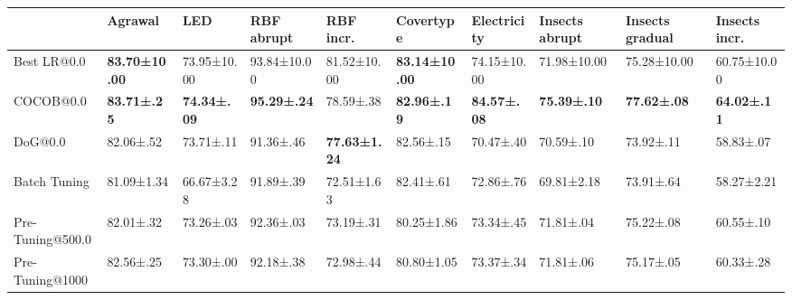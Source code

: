 \begin{tabular}{llllllllll}
    \toprule
                     & Agrawal               & LED                 & RBF abrupt          & RBF incr.            & Covertype             & Electricity         & Insects abrupt      & Insects gradual     & Insects incr.       \\ \midrule
    Best LR@0.0      & \bfseries 83.70±10.00 & 73.95±10.00         & 93.84±10.00         & 81.52±10.00          & \bfseries 83.14±10.00 & 74.15±10.00         & 71.98±10.00         & 75.28±10.00         & 60.75±10.00         \\
    COCOB@0.0        & \bfseries 83.71±.25   & \bfseries 74.34±.09 & \bfseries 95.29±.24 & 78.59±.38            & \bfseries 82.96±.19   & \bfseries 84.57±.08 & \bfseries 75.39±.10 & \bfseries 77.62±.08 & \bfseries 64.02±.11 \\
    DoG@0.0          & 82.06±.52             & 73.71±.11           & 91.36±.46           & \bfseries 77.63±1.24 & 82.56±.15             & 70.47±.40           & 70.59±.10           & 73.92±.11           & 58.83±.07           \\
    Batch Tuning     & 81.09±1.34            & 66.67±3.28          & 91.89±.39           & 72.51±1.63           & 82.41±.61             & 72.86±.76           & 69.81±2.18          & 73.91±.64           & 58.27±2.21          \\
    Pre-Tuning@500.0 & 82.01±.32             & 73.26±.03           & 92.36±.03           & 73.19±.31            & 80.25±1.86            & 73.34±.45           & 71.81±.04           & 75.22±.08           & 60.55±.10           \\
    Pre-Tuning@1000  & 82.56±.25             & 73.30±.00           & 92.18±.38           & 72.98±.44            & 80.80±1.05            & 73.37±.34           & 71.81±.06           & 75.17±.05           & 60.33±.28           \\
    \bottomrule
\end{tabular}
